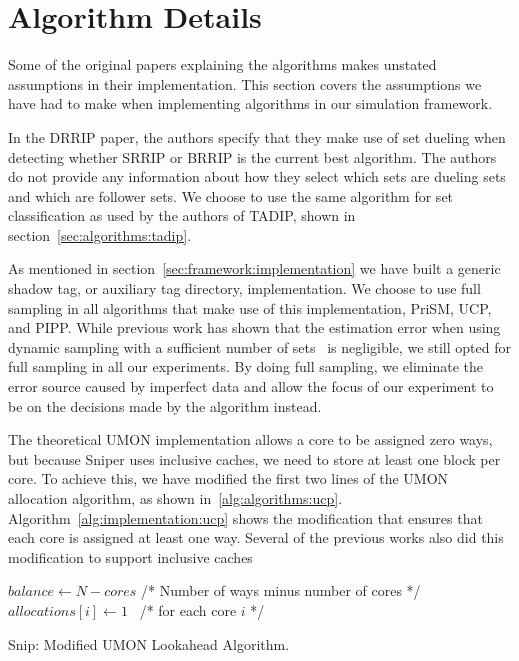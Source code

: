 \section{Algorithm Details}
\label{sec:framework:algorithms}

Some of the original papers explaining the algorithms makes unstated assumptions in their implementation.
This section covers the assumptions we have had to make when implementing algorithms in our simulation framework.

In the DRRIP paper, the authors specify that they make use of set dueling when detecting whether SRRIP or BRRIP is the current best algorithm.
The authors do not provide any information about how they select which sets are dueling sets and which are follower sets.
We choose to use the same algorithm for set classification as used by the authors of TADIP, shown in section~\ref{sec:algorithms:tadip}.

As mentioned in section~\ref{sec:framework:implementation} we have built a generic shadow tag, or auxiliary tag directory, implementation.
We choose to use full sampling in all algorithms that make use of this implementation, PriSM, UCP, and PIPP.
While previous work has shown that the estimation error when using dynamic sampling with a sufficient number of sets~\cite{} is negligible, we still opted for full sampling in all our experiments.
By doing full sampling, we eliminate the error source caused by imperfect data and allow the focus of our experiment to be on the decisions made by the algorithm instead.

The theoretical UMON implementation allows a core to be assigned zero ways, but because Sniper uses inclusive caches, we need to store at least one block per core.
To achieve this, we have modified the first two lines of the UMON allocation algorithm, as shown in~\ref{alg:algorithms:ucp}.
Algorithm~\ref{alg:implementation:ucp} shows the modification that ensures that each core is assigned at least one way.
Several of the previous works also did this modification to support inclusive caches~\cite{Qureshi2006,Xie2009}

\begin{algorithm}[ht]
\begin{algorithmic}[1]
\State $balance\gets N - cores $ /* Number of ways minus number of cores */
\State $allocations[i]\gets 1$  /* for each core $i$ */
\end{algorithmic}
\caption{Snip: Modified UMON Lookahead Algorithm.}
\label{alg:implementation:ucp}
\end{algorithm}

